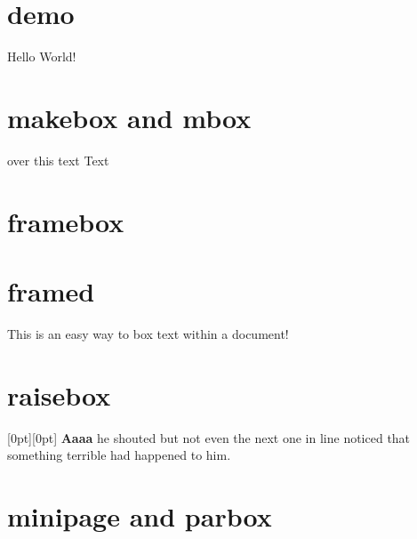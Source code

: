 \documentclass{article}
\begin{document}
\section{demo}
Hello World!

\section{makebox and mbox}
 over this text
\hspace{-15ex}
Text 

\section{framebox}
 \par
{} \par
{} \par
{} \par
{}


\section{framed}
\begin{framed}
This is an easy way to box text within a document!
\end{framed}

\section{raisebox}
\begin{framed}
\raisebox{0pt}[0pt][0pt]{\Large%
\textbf{Aaaa\raisebox{-0.3ex}{a}%
\raisebox{-0.7ex}{aa}%
\raisebox{-1.2ex}{r}%
\raisebox{-2.2ex}{g}%
\raisebox{-4.5ex}{h}
}
}
he shouted but not even the next
one in line noticed that something
terrible had happened to him.
\end{framed}


\section{minipage and parbox}
\noindent
{}
\end{document}
